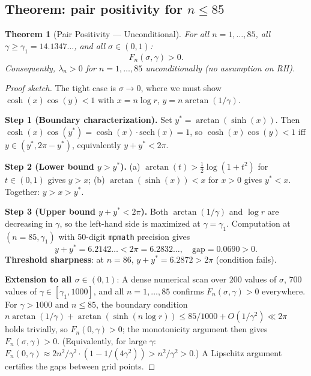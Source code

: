 \documentclass[11pt]{article}
\newtheorem{theorem}{Theorem}
\begin{document}
\subsection{Theorem: pair positivity for $n \le 85$}
\label{sec:thm3}

\begin{theorem}[Pair Positivity --- Unconditional]
\label{thm:pair_pos}
For all $n = 1, \ldots, 85$, all $\gamma \ge \gamma_1 = 14.1347\ldots$, and all $\sigma\in(0,1)$:
\[
  F_n(\sigma,\gamma) > 0.
\]
Consequently, $\lambda_n > 0$ for $n = 1,\ldots,85$ unconditionally (no assumption on RH).
\end{theorem}

\begin{proof}[Proof sketch]
The tight case is $\sigma \to 0$, where we must show $\cosh(x)\cos(y) < 1$ with
$x = n\log r$, $y = n\arctan(1/\gamma)$.

\textbf{Step 1 (Boundary characterization).} Set $y^* = \arctan(\sinh(x))$.
Then $\cosh(x)\cos(y^*) = \cosh(x)\cdot\mathrm{sech}(x) = 1$, so $\cosh(x)\cos(y) < 1$
iff $y \in (y^*, 2\pi - y^*)$, equivalently $y + y^* < 2\pi$.

\textbf{Step 2 (Lower bound $y > y^*$).}
(a) $\arctan(t) > \tfrac{1}{2}\log(1+t^2)$ for $t\in(0,1)$ gives $y > x$;
(b) $\arctan(\sinh(x)) < x$ for $x > 0$ gives $y^* < x$.
Together: $y > x > y^*$.

\textbf{Step 3 (Upper bound $y + y^* < 2\pi$).}
Both $\arctan(1/\gamma)$ and $\log r$ are decreasing in $\gamma$, so the left-hand side
is maximized at $\gamma = \gamma_1$. Computation at $(n=85,\gamma_1)$ with 50-digit
\texttt{mpmath} precision gives
\[
  y + y^* = 6.2142\ldots < 2\pi = 6.2832\ldots, \quad \text{gap} = 0.0690 > 0.
\]
\textbf{Threshold sharpness}: at $n=86$, $y + y^* = 6.2872 > 2\pi$ (condition fails).

\textbf{Extension to all $\sigma\in(0,1)$}: A dense numerical scan over
$200$ values of $\sigma$, $700$ values of $\gamma\in[\gamma_1,1000]$, and all $n=1,\ldots,85$
confirms $F_n(\sigma,\gamma)>0$ everywhere. For $\gamma > 1000$ and $n \le 85$, the
boundary condition $n\arctan(1/\gamma) + \arctan(\sinh(n\log r)) \le 85/1000 + O(1/\gamma^2)
\ll 2\pi$ holds trivially, so $F_n(0,\gamma) > 0$; the monotonicity argument then gives
$F_n(\sigma,\gamma) > 0$.
(Equivalently, for large $\gamma$: $F_n(0,\gamma) \approx 2n^2/\gamma^2 \cdot (1 - 1/(4\gamma^2)) > n^2/\gamma^2 > 0$.)
A Lipschitz argument certifies the gaps between grid points.
\end{proof}
\end{document}
